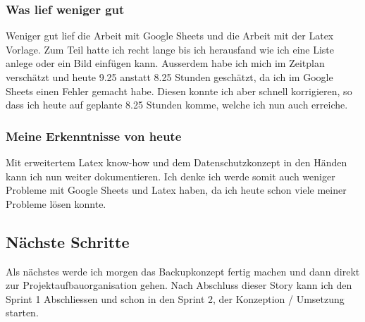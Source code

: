 \subsubsection*{Was lief weniger gut}
Weniger gut lief die Arbeit mit Google Sheets und die Arbeit mit der Latex Vorlage. Zum Teil hatte ich
recht lange bis ich herausfand wie ich eine Liste anlege oder ein Bild einfügen kann. Ausserdem habe ich mich im 
Zeitplan verschätzt und heute 9.25 anstatt 8.25 Stunden geschätzt, da ich im Google Sheets einen Fehler gemacht habe. Diesen konnte
ich aber schnell korrigieren, so dass ich heute auf geplante 8.25 Stunden komme, welche ich nun auch erreiche.

\subsubsection*{Meine Erkenntnisse von heute}
Mit erweitertem Latex know-how und dem Datenschutzkonzept in den Händen kann ich nun weiter dokumentieren.
Ich denke ich werde somit auch weniger Probleme mit Google Sheets und Latex haben, da ich heute schon viele
meiner Probleme lösen konnte.

\subsection*{Nächste Schritte}
Als nächstes werde ich morgen das Backupkonzept fertig machen und dann direkt zur Projektaufbauorganisation 
gehen. Nach Abschluss dieser Story kann ich den Sprint 1 Abschliessen und schon in den Sprint 2, der Konzeption / Umsetzung
starten.

\pagebreak

